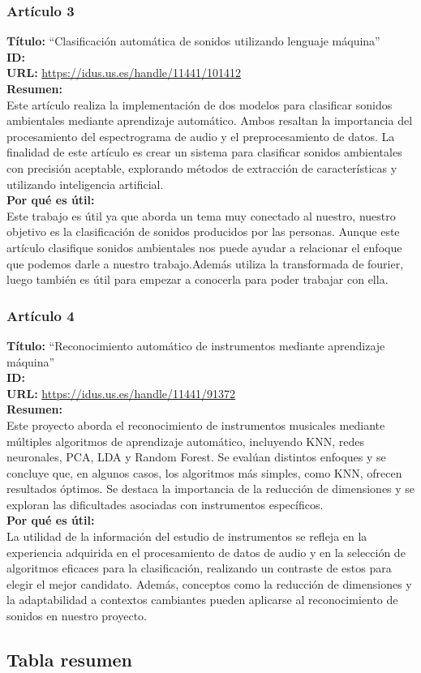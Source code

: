 \subsubsection*{Artículo 3}
\begin{flushleft}
    \textbf{Título:}
    “Clasificación automática de sonidos utilizando lenguaje máquina”
    \\
    \textbf{ID: \cite{rodriguez2020clasificacion}}
    \\
    \textbf{URL:}
    \url{https://idus.us.es/handle/11441/101412}
    \\
    \textbf{Resumen:\\}
    Este artículo realiza la implementación de dos modelos para clasificar sonidos ambientales mediante aprendizaje automático. Ambos resaltan la importancia del procesamiento del espectrograma de audio y el preprocesamiento de datos. La finalidad de este artículo es crear un sistema para clasificar sonidos ambientales con precisión aceptable, explorando métodos de extracción de características y utilizando inteligencia artificial.
    \\
    \textbf{Por qué es útil:\\}
    Este trabajo es útil ya que aborda un tema muy conectado al nuestro, nuestro objetivo es la clasificación de sonidos producidos por las personas. Aunque este artículo clasifique sonidos ambientales nos puede ayudar a relacionar el enfoque que podemos darle a nuestro trabajo.Además utiliza la transformada de fourier, luego también es útil para empezar a conocerla para poder trabajar con ella.
\end{flushleft}
\subsubsection*{Artículo 4}
\begin{flushleft}
    \textbf{Título:}
    “Reconocimiento automático de instrumentos mediante aprendizaje máquina”
    \\
    \textbf{ID: \cite{salgado2019reconocimiento}}
    \\
    \textbf{URL:}
    \url{https://idus.us.es/handle/11441/91372}
    \\
    \textbf{Resumen:\\}
    Este proyecto aborda el reconocimiento de instrumentos musicales mediante múltiples algoritmos de aprendizaje automático, incluyendo KNN, redes neuronales, PCA, LDA y Random Forest. Se evalúan distintos enfoques y se concluye que, en algunos casos, los algoritmos más simples, como KNN, ofrecen resultados óptimos. Se destaca la importancia de la reducción de dimensiones y se exploran las dificultades asociadas con instrumentos específicos.
    \\
    \textbf{Por qué es útil:\\}
    La utilidad de la información del estudio de instrumentos se refleja en la experiencia adquirida en el procesamiento de datos de audio y en la selección de algoritmos eficaces para la clasificación, realizando un contraste de estos para elegir el mejor candidato. Además, conceptos como la reducción de dimensiones y la adaptabilidad a contextos cambiantes pueden aplicarse al reconocimiento de sonidos en nuestro proyecto.
\end{flushleft}
\subsection{Tabla resumen}
